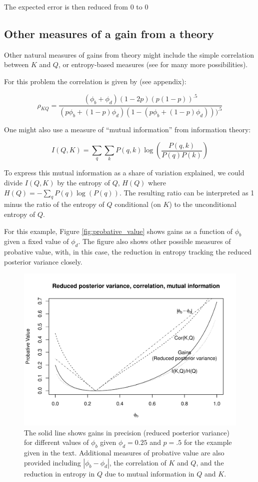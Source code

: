 \documentclass[12pt,]{book}
\begin{document}
The expected error is then reduced from 0 to
0

\hypertarget{other-measures-of-a-gain-from-a-theory}{%
\subsection{Other measures of a gain from a theory}\label{other-measures-of-a-gain-from-a-theory}}

Other natural measures of gains from theory might include the simple correlation between \(K\) and \(Q\), or entropy-based measures (see \citet{zhang2003properties} for many more possibilities).

For this problem the correlation is given by (see appendix):

\[\rho_{KQ} = \frac{(\phi_b+\phi_d)(1-2p)(p(1-p))^{.5}}{
(p\phi_b+(1-p)\phi_d)(1-(p\phi_b+(1-p)\phi_d)))^{.5}}\]

One might also use a measure of ``mutual information'' from information theory:

\[I(Q,K) = \sum_q \sum_k P(q,k)\log\left(\frac{P(q,k)}{P(q)P(k)}\right)\]

To express this mutual information as a share of variation explained, we could divide \(I(Q,K)\) by the entropy of \(Q\), \(H(Q)\) where \(H(Q) = -\sum_qP(q)\log(P(q))\). The resulting ratio can be interpreted as 1 minus the ratio of the entropy of \(Q\) conditional (on \(K\)) to the unconditional entropy of \(Q\).

For this example, Figure \ref{fig:probative_value} shows gains as a function of \(\phi_b\) given a fixed value of \(\phi_d\). The figure also shows other possible measures of probative value, with, in this case, the reduction in entropy tracking the reduced posterior variance closely.

\begin{figure}

{\centering \includegraphics[width=.7\textwidth]{ii_files/figure-latex/unnamed-chunk-71-1} 

}

\caption{\label{fig:probative_value} The solid line shows gains in precision (reduced posterior variance) for different values of $\phi_b$ given $\phi_d=0.25$ and $p=.5$ for the example given in the text. Additional measures of probative value are also provided including $|\phi_b - \phi_d|$, the correlation of $K$ and $Q$, and the reduction in entropy in $Q$ due to mutual information in $Q$ and $K$.}\label{fig:unnamed-chunk-71}
\end{figure}
\end{document}
